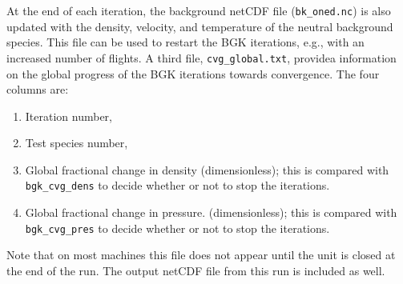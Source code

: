 \documentclass[12pt]{report}
\begin{document}
\begin{enumerate}
At the end of
each iteration, the background netCDF file ({\tt bk\_oned.nc}) is 
also updated with
the density, velocity, and temperature of the neutral background species.
This file can be used to restart the BGK iterations, e.g., with an increased 
number of flights. 
A third file, {\tt cvg\_global.txt}, providea information on the
global progress of the BGK iterations towards convergence. The four columns are:
\begin{enumerate}
  \item Iteration number,
  \item Test species number,
  \item Global fractional change in density (dimensionless); this is compared
with \verb+bgk_cvg_dens+ to decide whether or not to stop the iterations.
  \item Global fractional change in pressure. (dimensionless); this is compared
with \verb+bgk_cvg_pres+ to decide whether or not to stop the iterations.
\end{enumerate}
Note that on most 
machines this file does not appear until the unit is closed at the end of 
the run. The output netCDF file from this run is included as well.


\end{enumerate}
\end{document}
